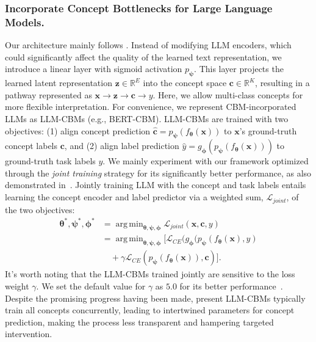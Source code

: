 \documentclass[letterpaper]{article} %
\DeclareMathOperator*{\argmin}{arg\,min}
\begin{document}
\subsubsection{Incorporate Concept Bottlenecks for Large Language Models.} Our architecture mainly follows \citet{tan2023cbm}. Instead of modifying LLM encoders, which could significantly affect the quality of the learned text representation, we introduce a linear layer with sigmoid activation $p_{\bm{\psi}}$. This layer projects the learned latent representation $\bm{z} \in \mathbb{R}^E$ into the concept space $\bm{c} \in \mathbb{R}^K$, resulting in a pathway represented as $\bm{x} \rightarrow \bm{z} \rightarrow \bm{c} \rightarrow y$. Here, we allow multi-class concepts for more flexible interpretation. For convenience, we represent CBM-incorporated LLMs as LLM-CBMs (e.g., BERT-CBM). LLM-CBMs are trained with two objectives: (1) align concept prediction $\hat{\bm{c}}=p_{\bm\psi}(f_{\bm\theta}(\bm{x}))$ to $\bm{x}$’s ground-truth concept labels $\bm{c}$, and (2) align label prediction $\hat{y}=g_{\bm\phi}(p_{\bm\psi}(f_{\bm\theta}(\bm{x})))$ to ground-truth task labels $y$. We mainly experiment with our framework optimized through the \textit{joint training} strategy for its significantly better performance, as also demonstrated in~\citet{tan2023cbm}.
Jointly training LLM with the concept and task labels entails learning the concept encoder and label predictor via a weighted sum, $\mathcal{L}_{joint}$, of the two objectives:
\begin{equation} \label{eq:joint}
\begin{aligned}
    \bm{\theta}^{\ast}, \bm{\psi}^{\ast}, \bm{\phi}^{\ast} &= \argmin_{\bm{\theta}, \bm{\psi}, \bm{\phi}} \mathcal{L}_{joint}(\bm{x}, \bm{c}, y) \\ &= \argmin_{\bm{\theta}, \bm{\psi}, \bm{\phi}} [\mathcal{L}_{CE} (g_{\bm{\phi}}(p_{\bm{\psi}}(f_{\bm{\theta}}(\bm{x}),y) \\ &\quad+ \gamma \mathcal{L}_{CE} (p_{\bm{\psi}}(f_{\bm{\theta}}(\bm{x})),\bm{c})].
\end{aligned}
\end{equation} 
It's worth noting that the LLM-CBMs trained jointly are sensitive to the loss weight $\gamma$. We set the default value for $\gamma$ as $5.0$ for its better performance~\citep{tan2023cbm}. Despite the promising progress having been made, present LLM-CBMs typically train all concepts concurrently, leading to intertwined parameters for concept prediction, making the process less transparent and hampering targeted intervention.
\end{document}
